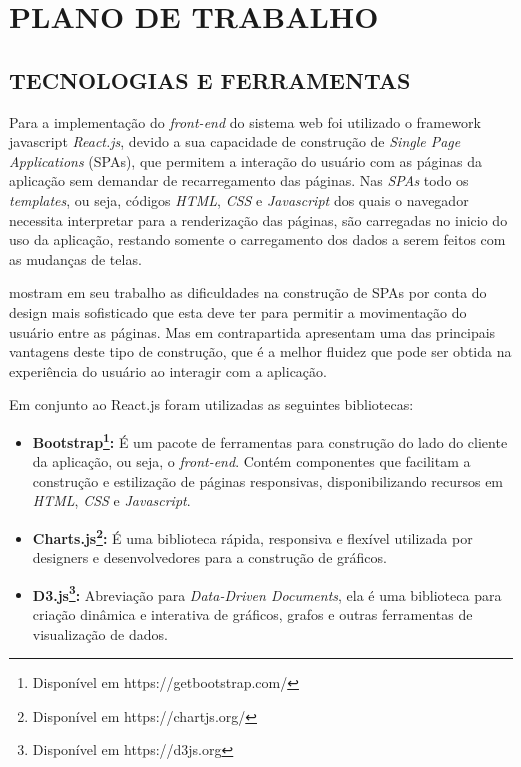 \chapter{PLANO DE TRABALHO}
\label{chap:planoTrabalho}

\section{TECNOLOGIAS E FERRAMENTAS}
\label{sec:tecnologiasFerramentas}
Para a implementação do \textit{front-end} do sistema web foi utilizado o framework javascript \textit{React.js}, devido a sua capacidade de construção de \textit{Single Page Applications} (SPAs), que permitem a interação do usuário com as páginas da aplicação sem demandar de recarregamento das páginas.
Nas \textit{SPAs} todo os \textit{templates}, ou seja, códigos \textit{HTML}, \textit{CSS} e \textit{Javascript} dos quais o navegador necessita interpretar para a renderização das páginas, são carregadas no inicio do uso da aplicação, restando somente o carregamento dos dados a serem feitos com as mudanças de telas.

 mostram em seu trabalho as dificuldades na construção de SPAs por conta do design mais sofisticado que esta deve ter para permitir a movimentação do usuário entre as páginas. 
Mas em contrapartida apresentam uma das principais vantagens deste tipo de construção, que é a melhor fluidez que pode ser obtida na experiência do usuário ao interagir com a aplicação.

Em conjunto ao React.js foram utilizadas as seguintes bibliotecas: 

\begin{itemize}[topsep=5pt]
    \item \textbf{Bootstrap\footnote{Disponível em https://getbootstrap.com/}:} É um pacote de ferramentas para construção do lado do cliente da aplicação, ou seja, o \textit{front-end}. Contém componentes que facilitam a construção e estilização de páginas responsivas, disponibilizando recursos em \textit{HTML}, \textit{CSS} e \textit{Javascript}.  
    \item \textbf{Charts.js\footnote{Disponível em https://chartjs.org/}:} É uma biblioteca rápida, responsiva e flexível utilizada por designers e desenvolvedores para a construção de gráficos.
    \item \textbf{D3.js\footnote{Disponível em https://d3js.org }:} Abreviação para \textit{Data-Driven Documents}, ela é uma biblioteca para criação dinâmica e interativa de gráficos, grafos e outras ferramentas de visualização de dados.
\end{itemize}

